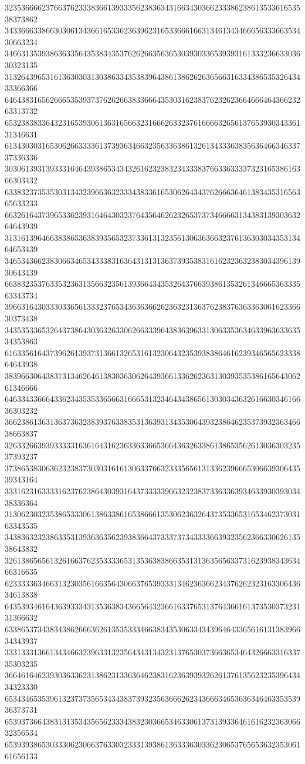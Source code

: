 32353666623766376233383661393335623836343166343036623338623861353361653538373862
34336663386630306134366165336236396231653366616631346134346665633366353430663234
34663135393863633564353834353762626635636530393033653939316133323663303630323135
31326439653161363030313038633435383964386138626263656631633438653532643433366366
64643831656266653539373762626638336664353031623837623262366466646436623263313732
65323838336432316539306136316566323166626332376166663265613765393034336131346631
61343030316530626633336137393634663235633638613261343336383563646634633737336336
30306139313933316464393865343432616232383234333837663363333732316538616366303432
63383237353530313432396636323334383361653062643437626663646138343531656365633233
66326164373965336239316464303237643564626232653737346666313438313930363264643939
31316139646638386536383935653237336131323561306363663237613630303435313464653439
34653436623830663465343338316364313131363739353831616232363238303439613930643439
66383235376335323631356632356139366434353264376639386135326134666536333563343734
39663164303330336561333237653436363662623632313637623837636336306162336630373438
34353533653264373864303632633062663339643836396331306335363463396363363534353863
61633561643739626139373136613265316132306432353938386461623934656562333864643938
38396630643837313462646138303630626439366133626236313039353538616564306261346666
64633433666433623435353365663166653132346434386561303034363261663034616636303232
36623861363136373632383937633835313639313435306439323864623537393236346638663837
32633266393933333163616431623633633665366436326338613865356261303630323537393237
37386538306362323837303031616130633766323335656131336239666530663930643539343164
33316231633331623762386430393164373333396632323837336336393463393039303438336364
31306230323538653330613863386165386661353062363264373533653165346237303163343535
34383632323863353139363635623938366437333737343333663932356236633062613538643832
32613865656132616637623533336531353638386635313136356563373162393834363466316635
62333336346631323035616635643066376539333134623636623437626232316330643634613838
64353934616436393334313536383436656432366163376531376436616137353037323131366632
63386537343834386266636261353533346638343530633434396464336561613138396634343937
33313331366134346632396331323564343134323137653037366365346432666331633735303235
36646164623930363362313862313363646238316236393932626137613562323539643434323330
65343465353961323737356534343837393235636662623436663465363634646335353936373731
65393736643831313534356562333438323036653463306137313933646161623236306632356534
65393938653033306230663763303233313938613633363033623065376565363235306161656133
